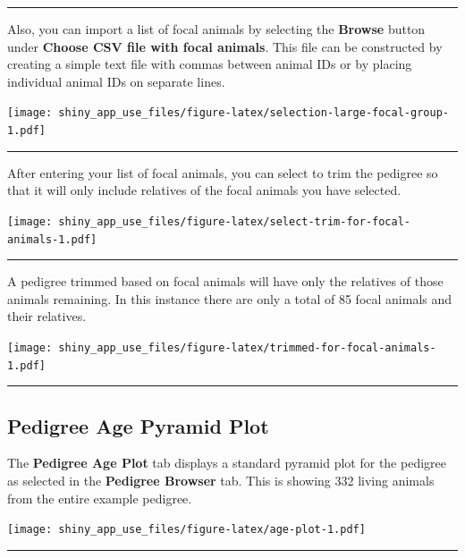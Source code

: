 \documentclass[
]{article}
\begin{document}
\begin{center}\rule{0.5\linewidth}{\linethickness}\end{center}

Also, you can import a list of focal animals by selecting the
\textbf{Browse} button under \textbf{Choose CSV file with focal
animals}. This file can be constructed by creating a simple text file
with commas between animal IDs or by placing individual animal IDs on
separate lines.

\texttt{[image: shiny\_app\_use\_files/figure-latex/selection-large-focal-group-1.pdf]}

\begin{center}\rule{0.5\linewidth}{\linethickness}\end{center}

After entering your list of focal animals, you can select to trim the
pedigree so that it will only include relatives of the focal animals you
have selected.

\texttt{[image: shiny\_app\_use\_files/figure-latex/select-trim-for-focal-animals-1.pdf]}

\begin{center}\rule{0.5\linewidth}{\linethickness}\end{center}

A pedigree trimmed based on focal animals will have only the relatives
of those animals remaining. In this instance there are only a total of
85 focal animals and their relatives.

\texttt{[image: shiny\_app\_use\_files/figure-latex/trimmed-for-focal-animals-1.pdf]}

\begin{center}\rule{0.5\linewidth}{\linethickness}\end{center}

\hypertarget{pedigree-age-pyramid-plot}{%
\subsection{Pedigree Age Pyramid Plot}\label{pedigree-age-pyramid-plot}}

The \textbf{Pedigree Age Plot} tab displays a standard pyramid plot for
the pedigree as selected in the \textbf{Pedigree Browser} tab. This is
showing 332 living animals from the entire example pedigree.

\texttt{[image: shiny\_app\_use\_files/figure-latex/age-plot-1.pdf]}

\begin{center}\rule{0.5\linewidth}{\linethickness}\end{center}
\end{document}
